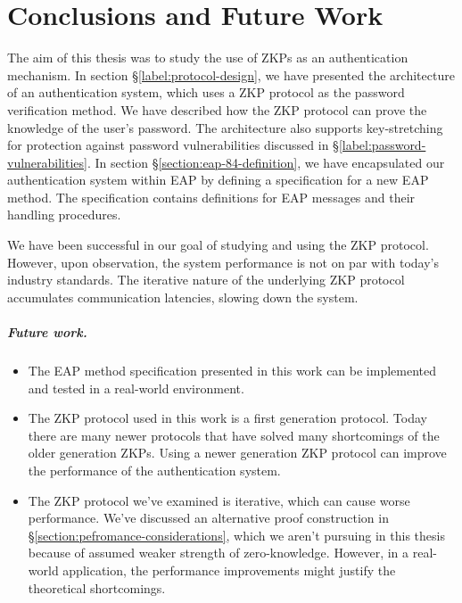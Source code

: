 \chapter{Conclusions and Future Work}
\label{chapter:4}
The aim of this thesis was to study the use of ZKPs as an authentication mechanism.
In section \S\ref{label:protocol-design}, we have presented the architecture of an authentication system, which uses a ZKP protocol as the password verification method.
We have described how the ZKP protocol can prove the knowledge of the user's password. The architecture also supports key-stretching for protection against password vulnerabilities discussed in \S\ref{label:password-vulnerabilities}.
In section \S\ref{section:eap-84-definition}, we have encapsulated our authentication system within EAP by defining a specification for a new EAP method.
The specification contains definitions for EAP messages and their handling procedures.

We have been successful in our goal of studying and using the ZKP protocol.
However, upon observation, the system performance is not on par with today's industry standards. The iterative nature of the underlying ZKP protocol accumulates communication latencies, slowing down the system.

\paragraph{Future work.}

\begin{itemize}
	\item The EAP method specification presented in this work can be implemented and tested in a real-world environment.
	\item The ZKP protocol used in this work is a first generation protocol. Today there are many newer protocols that have solved many shortcomings of the older generation ZKPs. Using a newer generation ZKP protocol can improve the performance of the authentication system.
	\item The ZKP protocol we've examined is iterative, which can cause worse performance. We've discussed an alternative proof construction in \S\ref{section:pefromance-considerations}, which we aren't pursuing in this thesis because of assumed weaker strength of zero-knowledge. However, in a real-world application, the performance improvements might justify the theoretical shortcomings.
\end{itemize}